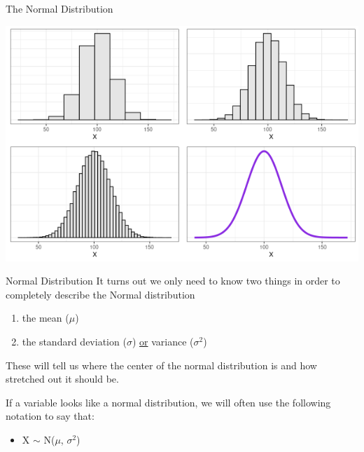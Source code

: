 \documentclass{beamer}
\begin{document}
\begin{frame}{The Normal Distribution}

\begin{center}
\includegraphics[scale=0.45]{normal_hist.png}
\end{center}
\end{frame}

\begin{frame}{Normal Distribution}
It turns out we only need to know two things in order to completely describe the Normal distribution
\begin{enumerate}
    \item the mean ($\mu$)
    \item the standard deviation ($\sigma$) \underline{or} variance ($\sigma^2$)
\end{enumerate} \vspace{4mm}

These will tell us where the center of the normal distribution is and how stretched out it should be. \vspace{4mm}

If a variable looks like a normal distribution, we will often use the following notation to say that:
\begin{itemize}
    \item X $\sim$ N($\mu$, $\sigma^2$)
\end{itemize}
\end{frame}
\end{document}
